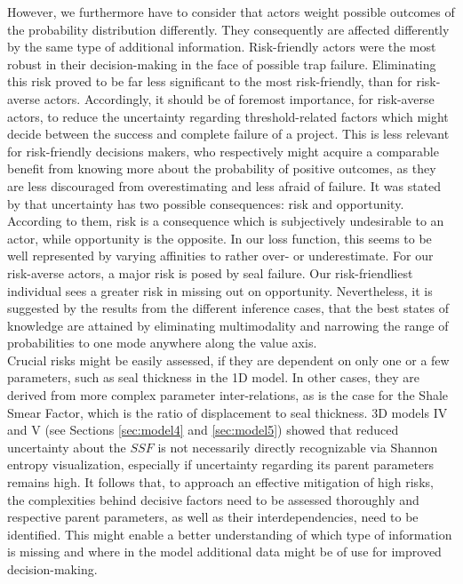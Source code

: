 	However, we furthermore have to consider that actors weight possible outcomes of the probability distribution differently. They consequently are affected differently by the same type of additional information. Risk-friendly actors were the most robust in their decision-making in the face of possible trap failure. Eliminating this risk proved to be far less significant to the most risk-friendly, than for risk-averse actors. Accordingly, it should be of foremost importance, for risk-averse actors, to reduce the uncertainty regarding threshold-related factors which might decide between the success and complete failure of a project. This is less relevant for risk-friendly decisions makers, who respectively might acquire a comparable benefit from knowing more about the probability of positive outcomes, as they are less discouraged from overestimating and less afraid of failure. It was stated by \citet{bratvold2010making} that uncertainty has two possible consequences: risk and opportunity. According to them, risk is a consequence which is subjectively undesirable to an actor, while opportunity is the opposite. In our loss function, this seems to be well represented by varying affinities to rather over- or underestimate. For our risk-averse actors, a major risk is posed by seal failure. Our risk-friendliest individual sees a greater risk in missing out on opportunity. Nevertheless, it is suggested by the results from the different inference cases, that the best states of knowledge are attained by eliminating multimodality and narrowing the range of probabilities to one mode anywhere along the value axis.\\
	Crucial risks might be easily assessed, if they are dependent on only one or a few parameters, such as seal thickness in the 1D model. In other cases, they are derived from more complex parameter inter-relations, as is the case for the Shale Smear Factor, which is the ratio of displacement to seal thickness. 3D models IV and V (see Sections \ref{sec:model4} and \ref{sec:model5}) showed that reduced uncertainty about the $SSF$ is not necessarily directly recognizable via Shannon entropy visualization, especially if uncertainty regarding its parent parameters remains high. It follows that, to approach an effective mitigation of high risks, the complexities behind decisive factors need to be assessed thoroughly and respective parent parameters, as well as their interdependencies, need to be identified. This might enable a better understanding of which type of information is missing and where in the model additional data might be of use for improved decision-making.\\	
